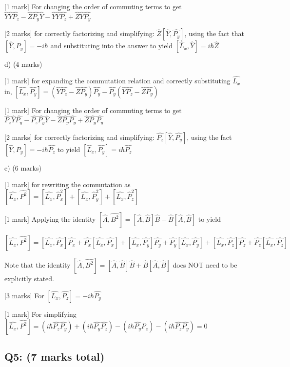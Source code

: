 \documentclass[a4paper,11pt]{article}
\begin{document}
[1 mark] For changing the order of commuting terms to get \( \hat{Y}\hat{Y}\hat{P_{z}} - \hat{Z}\hat{P_{y}}\hat{Y} - \hat{Y}\hat{Y}\hat{P_{z}} + \hat{Z}\hat{Y}\hat{P_{y}} \)

[2 marks] for correctly factorizing and simplifying: \( \hat{Z}[\hat{Y}, \hat{P_{y}}] \), using the fact that \( [\hat{Y}, \hat{P_{y}}] = -i\hbar \) and substituting into the answer to yield \( [\hat{L}_x, \hat{Y}] = i\hbar \hat{Z} \)

d) (4 marks)

[1 mark] for expanding the commutation relation and correctly substituting \( \hat{L_{x}} \) in, \([\hat{L_{x}}, \hat{P_{y}}] = (\hat{Y}\hat{P_{z}} - \hat{Z}\hat{P_{y}})\hat{P_{y}} - \hat{P_{y}}(\hat{Y}\hat{P_{z}} - \hat{Z}\hat{P_{y}})\)

[1 mark] For changing the order of commuting terms to get \( \hat{P_{z}}\hat{Y}\hat{P_{y}} - \hat{P_{z}}\hat{P_{y}}\hat{Y} - \hat{Z}\hat{P_{y}}\hat{P_{y}} + \hat{Z}\hat{P_{y}}\hat{P_{y}} \)

[2 marks] for correctly factorizing and simplifying: \( \hat{P_{z}}[\hat{Y}, \hat{P_{y}}] \), using the fact \( [\hat{Y}, \hat{P_{y}}] = -i\hbar \hat{P_{z}} \) to yield \( [\hat{L}_x, \hat{P_{y}}] = i\hbar\hat{P_{z}} \)

e) (6 marks)

[1 mark] for rewriting the commutation as \( [\hat{L_{x}}, \hat{P^{2}}] = [\hat{L_{x}}, \hat{P}_{x}^{2} ] + [\hat{L_{x}}, \hat{P}_{y}^{2}] + [\hat{L_{x}}, \hat{P}_{z}^{2}] \)

[1 mark] Applying the identity \( [\hat{A}, \hat{B^{2}}] = [\hat{A}, \hat{B}]\hat{B} + \hat{B}[\hat{A},\hat{B}] \) to yield 

\[ [\hat{L_{x}}, \hat{P^{2}}] = [\hat{L_{x}}, \hat{P_{x}}]\hat{P_{x}} + \hat{P_{x}}[\hat{L_x}, \hat{P_{x}}] + [\hat{L_{x}}, \hat{P_{y}}]\hat{P_{y}} + \hat{P_{y}}[\hat{L_{x}}, \hat{P_{y}}] + [\hat{L_{x}}, \hat{P_{z}}]\hat{P_{z}} + \hat{P_{z}}[\hat{L_{x}}, \hat{P_{z}}] \]

Note that the identity \( [\hat{A}, \hat{B^{2}}] = [\hat{A}, \hat{B}]\hat{B} + \hat{B}[\hat{A},\hat{B}] \) does NOT need to be explicitly stated.

[3 marks] For \( [\hat{L_{x}}, \hat{P_{z}}] = -i\hbar\hat{P_{y}} \)

[1 mark] For simplifying \( [\hat{L_{x}}, \hat{P^{2}}] = (i\hbar\hat{P_{z}}\hat{P_{y}}) + (i\hbar\hat{P_{y}}\hat{P_{z}}) - (i\hbar\hat{P_{y}}\hat{P_{z}}) - (i\hbar\hat{P_{z}}\hat{P_{y}}) = 0 \)

\subsection*{Q5: (7 marks total)}
\end{document}
